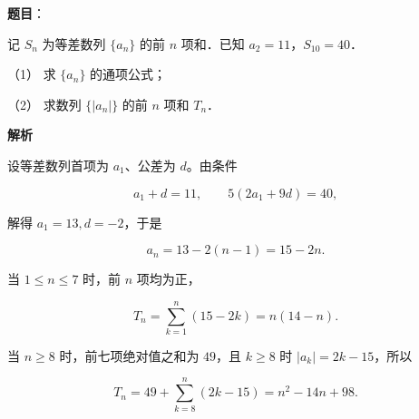 \begin{answer}

\textbf{题目}：

记 $S_n$ 为等差数列 $\{a_n\}$ 的前 $n$ 项和．已知 $a_2=11$，$S_{10}=40$．

（1） 求 $\{a_n\}$ 的通项公式；

（2） 求数列 $\{|a_n|\}$ 的前 $n$ 项和 $T_n$．

\textbf{解析}


设等差数列首项为 $a_1$、公差为 $d$。由条件

\nopagebreak[4]
\[
a_1+d=11,\qquad 5(2a_1+9d)=40,
\]

解得 $a_1=13,d=-2$，于是

\nopagebreak[4]
\[
a_n=13-2(n-1)=15-2n.
\]


当 $1\leqslant n\leqslant7$ 时，前 $n$ 项均为正，

\nopagebreak[4]
\[
T_n=\sum_{k=1}^n(15-2k)=n(14-n).
\]

当 $n\geqslant8$ 时，前七项绝对值之和为 $49$，且 $k\geqslant8$ 时 $|a_k|=2k-15$，所以

\nopagebreak[4]
\[
T_n=49+\sum_{k=8}^n(2k-15)=n^2-14n+98.
\]



\end{answer}
